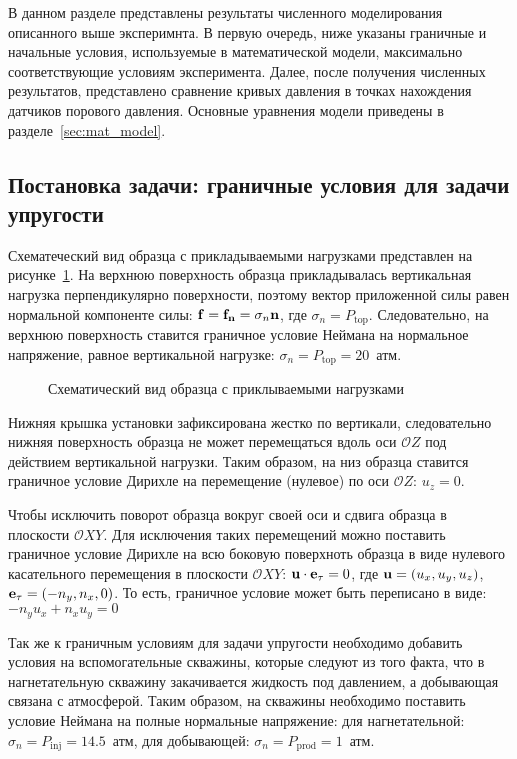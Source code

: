 В данном разделе представлены результаты численного моделирования описанного выше эксперимнта. В первую очередь, ниже указаны граничные и начальные условия, используемые в математической модели, максимально соответствующие условиям эксперимента. Далее, после получения численных результатов, представлено сравнение кривых давления в точках нахождения датчиков порового давления.
Основные уравнения модели приведены в разделе~\ref{sec:mat_model}.

\subsection{Постановка задачи: граничные условия для задачи упругости}

Схематеческий вид образца с прикладываемыми нагрузками представлен на рисунке~\ref{device5:pict}. На верхнюю поверхность образца прикладывалась вертикальная нагрузка перпендикулярно поверхности, поэтому вектор приложенной силы равен нормальной компоненте силы: $\mathbf{f}=\mathbf{f_n}=\sigma_n \mathbf{n}$, где $\sigma_n=P_\text{top}$. Следовательно, на верхнюю поверхность ставится граничное условие Неймана на нормальное напряжение, равное вертикальной нагрузке: $\sigma_n = P_\text{top} = 20$~атм.

\begin{figure}[hb]
\begin{center}
\end{center}
\caption{Схематический вид образца с приклываемыми нагрузками}\label{device5:pict}
\end{figure}

Нижняя крышка установки зафиксирована жестко по вертикали, следовательно нижняя поверхность образца не может перемещаться вдоль оси $\mathcal{O}Z$ под действием вертикальной нагрузки. Таким образом, на низ образца ставится граничное условие Дирихле на перемещение (нулевое) по оси  $\mathcal{O}Z$: $u_z = 0$.

Чтобы исключить поворот образца вокруг своей оси и сдвига образца в плоскости $\mathcal{O}XY$. Для исключения таких перемещений можно поставить граничное условие Дирихле на всю боковую поверхноть образца в виде нулевого касательного перемещения в плоскости $\mathcal{O}XY$: $\mathbf{u} \cdot \mathbf{e_\tau}=0$, где  $\mathbf{u}=(u_x, u_y, u_z)$, $\mathbf{e_\tau}=(-n_y, n_x, 0)$. То есть, граничное условие может быть переписано в виде: $-n_y u_x + n_x u_y=0$

Так же к граничным условиям для задачи упругости необходимо добавить условия на вспомогательные скважины, которые следуют из того факта, что в нагнетательную скважину закачивается жидкость под давлением, а добывающая связана с атмосферой. Таким образом, на скважины необходимо поставить условие Неймана на полные нормальные напряжение: для нагнетательной: $\sigma_n = P_\text{inj}=14.5$~атм, для добывающей: $\sigma_n =P_\text{prod}=1$~атм.

